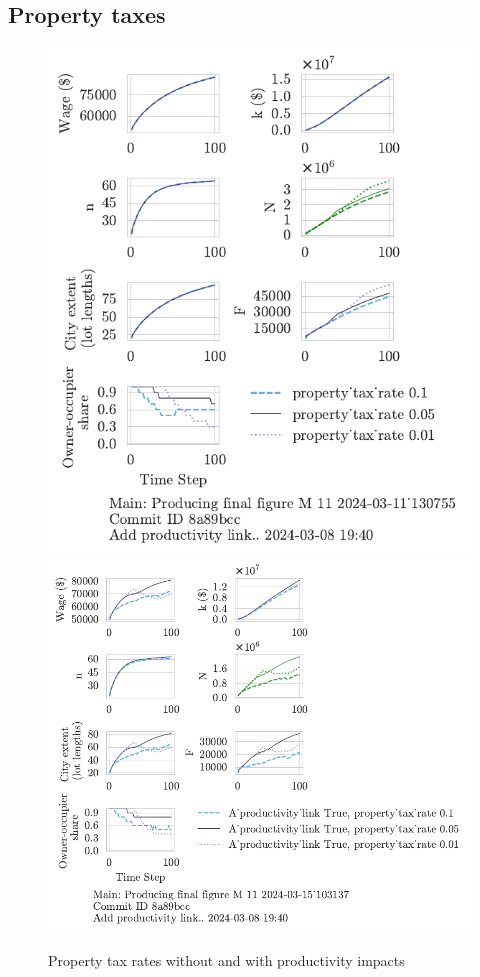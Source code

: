 \subsection{Property taxes}
\begin{figure}[h!tb] 
    \centering
    \includegraphics[scale=.75, trim={0 1.4cm .8cm 0},clip]{fig/property_tax_rate-Main-130755.pdf} 
    \includegraphics[scale=.75, trim={0 1.4cm 4.75cm 0},clip]{fig/With-productivity_link-property_tax-103137.pdf} 
    \caption{Property tax rates without and with productivity impacts}
    \label{fig:Productivity_link_W-WO-property_tax}
\end{figure}

